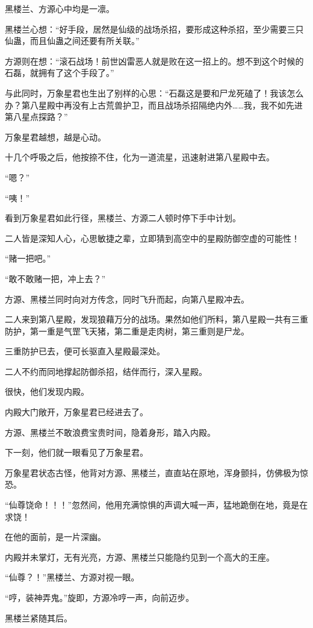 \begin{this_body}
黑楼兰、方源心中均是一凛。

黑楼兰心想：“好手段，居然是仙级的战场杀招，要形成这种杀招，至少需要三只仙蛊，而且仙蛊之间还要有所关联。”

方源则在想：“滚石战场！前世凶雷恶人就是败在这一招上的。想不到这个时候的石磊，就拥有了这个手段了。”

与此同时，万象星君也生出了别样的心思：“石磊这是要和尸龙死磕了！我该怎么办？第八星殿中再没有上古荒兽护卫，而且战场杀招隔绝内外……我，我不如先进第八星点探路？”

万象星君越想，越是心动。

十几个呼吸之后，他按捺不住，化为一道流星，迅速射进第八星殿中去。

“嗯？”

“咦！”

看到万象星君如此行径，黑楼兰、方源二人顿时停下手中计划。

二人皆是深知人心，心思敏捷之辈，立即猜到高空中的星殿防御空虚的可能性！

“赌一把吧。”

“敢不敢赌一把，冲上去？”

方源、黑楼兰同时向对方传念，同时飞升而起，向第八星殿冲去。

二人来到第八星殿，发现狼藉万分的战场。果然如他们所料，第八星殿一共有三重防护，第一重是气罡飞天猪，第二重是走肉树，第三重则是尸龙。

三重防护已去，便可长驱直入星殿最深处。

二人不约而同地撑起防御杀招，结伴而行，深入星殿。

很快，他们发现内殿。

内殿大门敞开，万象星君已经进去了。

方源、黑楼兰不敢浪费宝贵时间，隐着身形，踏入内殿。

下一刻，他们就一眼看见了万象星君。

万象星君状态古怪，他背对方源、黑楼兰，直直站在原地，浑身颤抖，仿佛极为惊恐。

“仙尊饶命！！！”忽然间，他用充满惊惧的声调大喊一声，猛地跪倒在地，竟是在求饶！

在他的面前，是一片深幽。

内殿并未掌灯，无有光亮，方源、黑楼兰只能隐约见到一个高大的王座。

“仙尊？！”黑楼兰、方源对视一眼。

“哼，装神弄鬼。”旋即，方源冷哼一声，向前迈步。

黑楼兰紧随其后。


\end{this_body}
